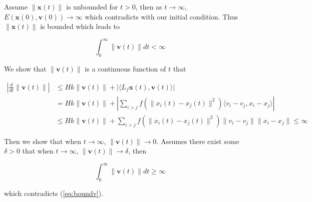 \noindent
Assume $\|\mathbf{x}(t)\|$ is unbounded for $t>0$, then as $t\to\infty$, $E(\mathbf{x}(0), \mathbf{v}(0))\to\infty$ which contradicts with our initial condition. Thus $\|\mathbf{x}(t)\|$ is bounded which leads to

\begin{equation}\label{eq:boundv}
\int_0^{\infty}\|\mathbf{v}(t)\|dt<\infty
\end{equation}

\noindent
We show that $\|\mathbf{v}(t)\|$ is a continuous function of $t$ that

\begin{equation}
\begin{aligned}
|\frac{d}{dt}\|\mathbf{v}(t)\||&\leq Hk\|\mathbf{v}(t)\|+|\langle L_f\mathbf{x}(t), \mathbf{v}(t)\rangle|\\
&=Hk\|\mathbf{v}(t)\|+|\sum_{i>j}f(\|x_i(t)-x_j(t)\|^2)\langle v_i-v_j, x_i-x_j\rangle|\\
&\leq Hk\|\mathbf{v}(t)\|+\sum_{i>j}f(\|x_i(t)-x_j(t)\|^2)\|v_i-v_j\| \|x_i-x_j\|\leq\infty
\end{aligned}
\end{equation}

\noindent
Then we show that when $t\to\infty$, $\|\mathbf{v}(t)\|\to0$. Assumes there exist some $\delta>0$ that when $t\to\infty$, $\|\mathbf{v}(t)\|\to\delta$, then

\begin{equation}
\int_0^{\infty}\|\mathbf{v}(t)\|dt\geq\infty
\end{equation}

\noindent
which contradicts (\ref{eq:boundv}).

\newpage

